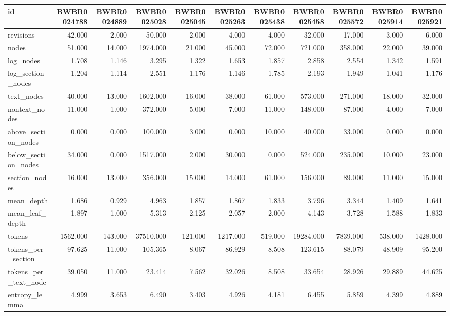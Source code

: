 \begin{tabular}{lrrrrrrrrrr}
\toprule
id & BWBR0024788 & BWBR0024889 & BWBR0025028 & BWBR0025045 & BWBR0025263 & BWBR0025438 & BWBR0025458 & BWBR0025572 & BWBR0025914 & BWBR0025921 \\
\midrule
revisions & 42.000 & 2.000 & 50.000 & 2.000 & 4.000 & 4.000 & 32.000 & 17.000 & 3.000 & 6.000 \\
\cline{1-11}
nodes & 51.000 & 14.000 & 1974.000 & 21.000 & 45.000 & 72.000 & 721.000 & 358.000 & 22.000 & 39.000 \\
\cline{1-11}
log\_nodes & 1.708 & 1.146 & 3.295 & 1.322 & 1.653 & 1.857 & 2.858 & 2.554 & 1.342 & 1.591 \\
\cline{1-11}
log\_section\_nodes & 1.204 & 1.114 & 2.551 & 1.176 & 1.146 & 1.785 & 2.193 & 1.949 & 1.041 & 1.176 \\
\cline{1-11}
text\_nodes & 40.000 & 13.000 & 1602.000 & 16.000 & 38.000 & 61.000 & 573.000 & 271.000 & 18.000 & 32.000 \\
\cline{1-11}
nontext\_nodes & 11.000 & 1.000 & 372.000 & 5.000 & 7.000 & 11.000 & 148.000 & 87.000 & 4.000 & 7.000 \\
\cline{1-11}
above\_section\_nodes & 0.000 & 0.000 & 100.000 & 3.000 & 0.000 & 10.000 & 40.000 & 33.000 & 0.000 & 0.000 \\
\cline{1-11}
below\_section\_nodes & 34.000 & 0.000 & 1517.000 & 2.000 & 30.000 & 0.000 & 524.000 & 235.000 & 10.000 & 23.000 \\
\cline{1-11}
section\_nodes & 16.000 & 13.000 & 356.000 & 15.000 & 14.000 & 61.000 & 156.000 & 89.000 & 11.000 & 15.000 \\
\cline{1-11}
mean\_depth & 1.686 & 0.929 & 4.963 & 1.857 & 1.867 & 1.833 & 3.796 & 3.344 & 1.409 & 1.641 \\
\cline{1-11}
mean\_leaf\_depth & 1.897 & 1.000 & 5.313 & 2.125 & 2.057 & 2.000 & 4.143 & 3.728 & 1.588 & 1.833 \\
\cline{1-11}
tokens & 1562.000 & 143.000 & 37510.000 & 121.000 & 1217.000 & 519.000 & 19284.000 & 7839.000 & 538.000 & 1428.000 \\
\cline{1-11}
tokens\_per\_section & 97.625 & 11.000 & 105.365 & 8.067 & 86.929 & 8.508 & 123.615 & 88.079 & 48.909 & 95.200 \\
\cline{1-11}
tokens\_per\_text\_node & 39.050 & 11.000 & 23.414 & 7.562 & 32.026 & 8.508 & 33.654 & 28.926 & 29.889 & 44.625 \\
\cline{1-11}
entropy\_lemma & 4.999 & 3.653 & 6.490 & 3.403 & 4.926 & 4.181 & 6.455 & 5.859 & 4.399 & 4.889 \\

\end{tabular}
